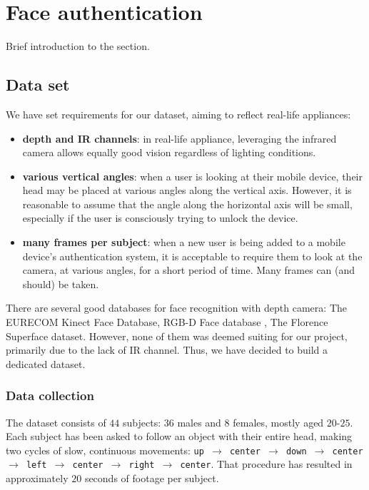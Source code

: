 \section{Face authentication}
    Brief introduction to the section.

    \subsection{Data set}
    We have set requirements for our dataset, aiming to reflect real-life
    appliances:
    \begin{itemize}
        \item \textbf{depth and IR channels}: in real-life appliance, leveraging
        the infrared camera allows equally good vision regardless of lighting
        conditions.
        \item \textbf{various vertical angles}: when a user is looking at their
        mobile device,
        their head may be placed at various angles along the vertical axis.
        However, it is reasonable to assume that the angle along the horizontal
        axis will be small, especially if the user is consciously trying to
        unlock the device.
        \item \textbf{many frames per subject}: when a new user is being added
        to a mobile device's authentication system, it is acceptable to require
        them to look at the camera, at various angles, for a short period of
        time. Many frames can (and should) be taken.
    \end{itemize}

    There are several good databases for face recognition with depth camera:
    The EURECOM Kinect Face Database\cite{eurecom},
    RGB-D Face database \cite{vapaaudk},
    The Florence Superface dataset\cite{superface}. However, none of them was
    deemed suiting for our project, primarily due to the lack of IR channel.
    Thus, we have decided to build a dedicated dataset.

    \subsubsection*{Data collection}
    The dataset consists of $44$ subjects: $36$ males and
    $8$ females, mostly aged $20$-$25$. Each subject has been asked to
    follow an object with their entire head, making two cycles of slow,
    continuous movements: \texttt{up $\to$ center $\to$ down $\to$ center $\to$
    left $\to$ center $\to$ right $\to$ center}.
    That procedure has resulted in approximately $20$ seconds of footage per
    subject.

